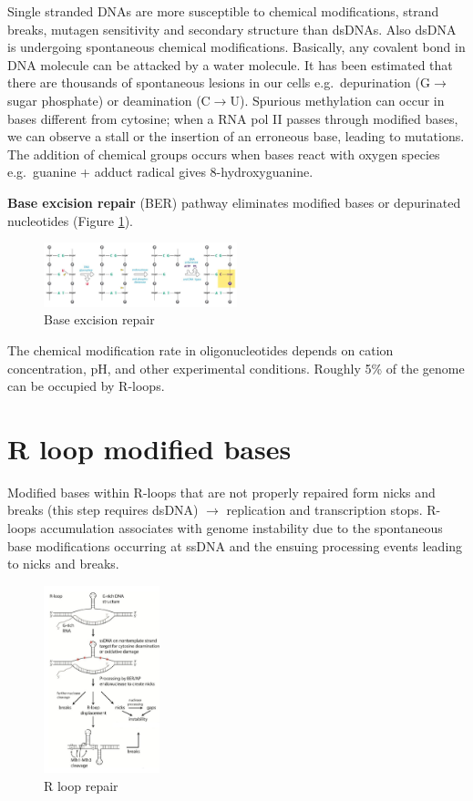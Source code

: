 Single stranded DNAs are more susceptible to chemical modifications, strand breaks, mutagen sensitivity and secondary structure than dsDNAs. Also dsDNA is undergoing spontaneous chemical modifications. Basically, any covalent bond in DNA molecule can be attacked by a water molecule. It has been estimated that there are thousands of spontaneous lesions in our cells e.g.~depurination (G$\rightarrow$sugar phosphate) or deamination (C$\rightarrow$U). Spurious methylation can occur in bases different from cytosine; when a RNA pol II passes through modified bases, we can observe a stall or the insertion of an erroneous base, leading to mutations. The addition of chemical groups occurs when bases react with oxygen species e.g.~guanine + adduct radical gives 8-hydroxyguanine.

\textbf{Base excision repair} (BER) pathway eliminates modified bases or depurinated nucleotides (Figure \ref{fig:ber}).

\begin{figure}
\centering
\includegraphics[width=0.5\textwidth]{../_resources/Screen_Shot_2022-11-30_at_08-49-05.png}
\caption{Base excision repair}
\label{fig:ber}
\end{figure}

The chemical modification rate in oligonucleotides depends on cation concentration, pH, and other experimental conditions. Roughly 5\% of the genome can be occupied by R-loops.

\hypertarget{r-loop-modified-bases}{%
\section{R loop modified bases}\label{r-loop-modified-bases}}

Modified bases within R-loops that are not properly repaired form nicks and breaks (this step requires dsDNA) $\rightarrow$ replication and transcription stops. R-loops accumulation associates with genome instability due to the spontaneous base modifications occurring at ssDNA and the ensuing processing events leading to nicks and breaks.

\begin{figure}
\centering
\includegraphics[width=0.3\textwidth]{../_resources/Screen_Shot_2022-11-30_at_08-51-07.png}
\caption{R loop repair}
\label{fig:rrep}
\end{figure}

